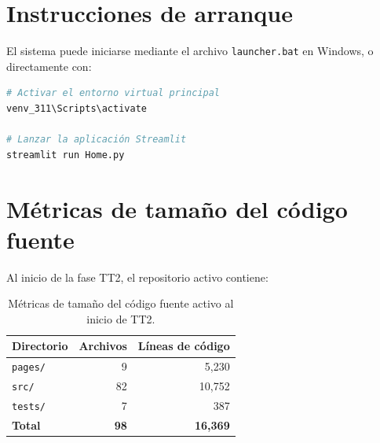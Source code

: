 \documentclass[12pt]{report}
\begin{document}
\section{Instrucciones de arranque}

El sistema puede iniciarse mediante el archivo \texttt{launcher.bat} en Windows,
o directamente con:

\begin{lstlisting}[language=bash, caption={Arranque manual del sistema.}]
# Activar el entorno virtual principal
venv_311\Scripts\activate

# Lanzar la aplicación Streamlit
streamlit run Home.py
\end{lstlisting}

\section{Métricas de tamaño del código fuente}

Al inicio de la fase TT2, el repositorio activo contiene:

\begin{table}[H]
    \centering
    \begin{tabular}{@{}lrr@{}}
        \toprule
        \textbf{Directorio} & \textbf{Archivos} & \textbf{Líneas de código} \\
        \midrule
        \texttt{pages/}  & 9  & 5,230  \\
        \texttt{src/}    & 82 & 10,752 \\
        \texttt{tests/}  & 7  & 387    \\
        \midrule
        \textbf{Total}   & \textbf{98} & \textbf{16,369} \\
        \bottomrule
    \end{tabular}
    \caption{Métricas de tamaño del código fuente activo al inicio de TT2.}
    \label{tab:loc}
\end{table}
\end{document}
